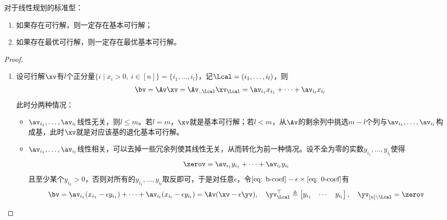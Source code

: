 \documentclass{ctexart}
\begin{document}
\begin{theorem} 
    对于线性规划的标准型：
    \begin{enumerate}
        \item 如果存在可行解，则一定存在基本可行解；
        \item 如果存在最优可行解，则一定存在最优基本可行解。
    \end{enumerate}
\end{theorem}

\begin{proof}
    \begin{enumerate}
        \item 设可行解$\xv$有$l$个正分量$\{ i \mid x_i > 0, ~ i \in [n] \} = \{ i_1, \ldots, i_l \}$，记$\Lcal = (i_1, \ldots, i_l)$，则
              \begin{align} \label{eq: b-coef}
                  \bv = \Av \xv = \Av_{:,\Lcal} \xv_\Lcal = \av_{i_1} x_{i_1} + \cdots + \av_{i_l} x_{i_l}
              \end{align}
              此时分两种情况：
              \begin{itemize}
                  \item $\av_{i_1}, \ldots, \av_{i_l}$线性无关，则$l \le m$。若$l = m$，$\xv$就是基本可行解；若$l < m$，从$\Av$的剩余列中挑选$m-l$个列与$\av_{i_1}, \ldots, \av_{i_l}$构成基，此时$\xv$就是对应该基的退化基本可行解。
                  \item $\av_{i_1}, \ldots, \av_{i_l}$线性相关，可以去掉一些冗余列使其线性无关，从而转化为前一种情况。设不全为零的实数$y_{i_1}, \ldots, y_{i_l}$使得
                        \begin{align} \label{eq: 0-coef}
                            \zerov = \av_{i_1} y_{i_1} + \cdots + \av_{i_l} y_{i_l}
                        \end{align}
                        且至少某个$y_{i_k} > 0$，否则对所有的$y_{i_1}, \ldots, y_{i_l}$取反即可，于是对任意$\epsilon$，令$\eqref{eq: b-coef} - \epsilon \times \eqref{eq: 0-coef}$有
                        \begin{align*}
                            \bv = \av_{i_1} (x_{i_1} - \epsilon y_{i_1}) + \cdots + \av_{i_l} (x_{i_l} - \epsilon y_{i_l}) = \Av (\xv - \epsilon \yv), \quad
                            \yv_\Lcal^\top \triangleq
                            \begin{bmatrix}
                                y_{i_1} & \cdots & y_{i_l}
                            \end{bmatrix}, \quad \yv_{[n] \setminus \Lcal} = \zerov

\end{align*}
\end{itemize}
\end{enumerate}
\end{proof}
\end{document}
